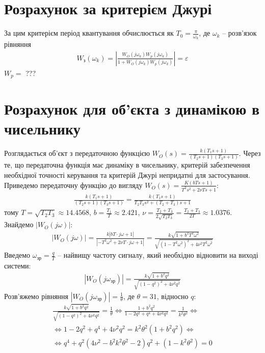 \section{Розрахунок за критерієм Джурі}
За цим критерієм період квантування обчислюється як $T_0 = \frac{\pi}{\omega_k}$, де 
$\omega_k$ -- розв'язок рівняння
\begin{gather}
    W_{\text{з}}(\omega_k) 
    = \left|
        \frac{W_O (j \omega_k) W_p (j \omega_k)}{
            1 + W_O (j \omega_k) W_p (j \omega_k)
        }
    \right| = \varepsilon
\end{gather}
$W_p =$ ???
\section{Розрахунок для об'єкта з динамікою в чисельнику}
Розглядається об'єкт з передаточною функцією $W_O(s) = \frac{
    k (T_1 s + 1)
}{
    (T_2 s + 1) (T_3 s + 1)
}$. Через те, що передаточна функція має динаміку в чисельнику, критерій забезпечення необхідної точності керування
та критерій Джурі непридатні для застосування. Приведемо передаточну функцію до вигляду
$W_O(s) = \frac{K (b T s + 1)}{T^2 s^2 + 2 \nu T s + 1}$:
\begin{gather*}
    \frac{
        k (T_1 s + 1)
    }{
        (T_2 s + 1) (T_3 s + 1)
    } = \frac{k (T_1 s + 1)}{T_2 T_3 s^2 + (T_2 + T_3) s + 1}
\end{gather*}
тому $T = \sqrt{T_2 T_3} \approx 14.4568$, $b = \frac{T_1}{T} \approx 2.421$, $\nu = \frac{T_2 + T_3}{2\sqrt{T_2 T_3}} = \frac{T_2 + T_3}{2T} \approx 1.0376$.
Знайдемо $\left|W_O (j \omega)\right|$:
\begin{gather*}
    \left|W_O (j \omega)\right| = \frac{
        k \left| bT \cdot j \omega + 1 \right|
    }{
        \left| -T^2 \omega^2 + 2\nu T \cdot j \omega + 1\right|
    } = 
    \frac{
        k \sqrt{1 + b^2 T^2 \omega^2}
    }{
        \sqrt{
            \left(1 - T^2 \omega^2\right)^2 + 4 \nu^2 T^2 \omega^2
        }
    }
\end{gather*}
Введемо $\omega_{\text{зр}} = \frac{q}{T}$ -- найвищу частоту сигналу, який необхідно відновити на виході системи:
\begin{gather*}
    \left|W_O (j \omega_{\text{зр}})\right| = 
    \frac{k\sqrt{1 + b^2 q^2}}{
        \sqrt{
            \left(1 - q^2\right)^2 + 4 \nu^2 q^2
        }
    }
\end{gather*}
Розв'яжемо рівняння $\left|W_O (j \omega_{\text{зр}})\right| = \frac{1}{\theta}$, де $\theta = 31$, відносно $q$:
\begin{gather*}
    \frac{k\sqrt{1 + b^2 q^2}}{
        \sqrt{
            \left(1 - q^2\right)^2 + 4 \nu^2 q^2
        }
    } = \frac{1}{\theta} \Leftrightarrow
    \frac{1 + b^2 q^2}{1 - 2 q^2 + q^4 + 4 \nu^2 q^2} = \frac{1}{k^2 \theta^2} \Leftrightarrow \\
    \Leftrightarrow 
    1 - 2 q^2 + q^4 + 4 \nu^2 q^2 = k^2 \theta^2 \left(1 + b^2 q^2\right) \Leftrightarrow \\
    \Leftrightarrow
    q^4 + q^2 \left(4 \nu^2 - b^2 k^2 \theta^2 - 2\right) q^2 + \left(1 - k^2 \theta^2\right) = 0
\end{gather*}
